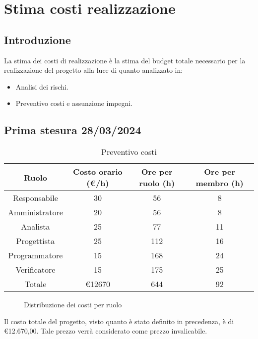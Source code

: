 \section{Stima costi realizzazione}
\subsection{Introduzione}
La stima dei costi di realizzazione è la stima del budget totale necessario per la realizzazione del progetto alla luce di quanto analizzato in:
\begin{itemize}
    \item Analisi dei rischi.
    \item Preventivo costi e assunzione impegni.
\end{itemize}

\subsection{Prima stesura 28/03/2024}

\begin{table}[!h]
	\centering
		\begin{tabular}{ |c|c|c|c| }
			\hline
			\textbf{Ruolo}   & \textbf{Costo orario (€/h)} & \textbf{Ore per ruolo (h)} & \textbf{Ore per membro (h)} \\
			\hline
			Responsabile   & 30           & 56            & 8              \\
			Amministratore & 20           & 56            & 8              \\
			Analista       & 25           & 77            & 11             \\
			Progettista    & 25           & 112           & 16             \\
			Programmatore  & 15           & 168           & 24             \\
			Verificatore   & 15           & 175           & 25             \\
			\hline
			Totale         & €12670       & 644           & 92             \\
			\hline
		\end{tabular}
        \caption{Preventivo costi}
    \label{tab:2}
\end{table}


\begin{figure*}
    \centering
    \caption{Distribuzione dei costi per ruolo}
    \label{fig:1}
    \end{figure*}

Il costo totale del progetto, visto quanto è stato definito in precedenza, è di €12.670,00. Tale prezzo verrà considerato come prezzo invalicabile. 
\newpage
